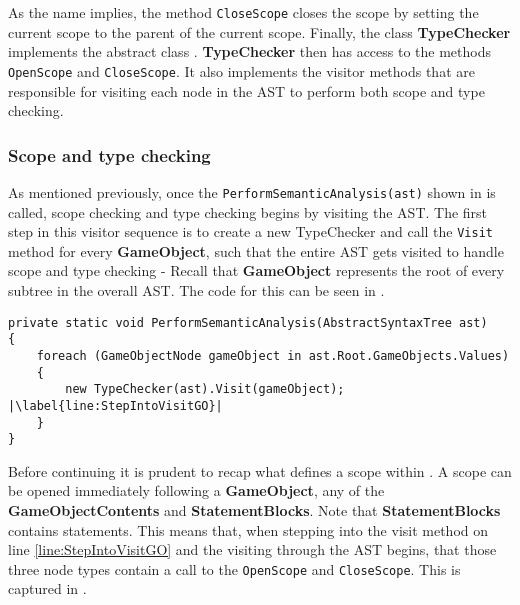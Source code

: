 As the name implies, the method \texttt{CloseScope} closes the scope by setting the current scope to the parent of the current scope. 
Finally, the class \textbf{TypeChecker} implements the abstract class \abstractsemanticclass{}. \textbf{TypeChecker} then has access to the methods \texttt{OpenScope} and \texttt{CloseScope}. It also implements the visitor methods that are responsible for visiting each node in the AST to perform both scope and type checking.

\subsubsection*{Scope and type checking} \label{sec:TypeChecker}
As mentioned previously, once the \texttt{PerformSemanticAnalysis(ast)} shown in  is called, scope checking and type checking begins by visiting the AST. The first step in this visitor sequence is to create a new TypeChecker and call the \texttt{Visit} method for every \textbf{GameObject}, such that the entire AST gets visited to handle scope and type checking - Recall that \textbf{GameObject} represents the root of every subtree in the overall AST. The code for this can be seen in .

\begin{lstlisting}[language=CSharp, caption={Typechecker object for every GameObject}, label={lst:TypeCheckEachGO},escapechar=|]
private static void PerformSemanticAnalysis(AbstractSyntaxTree ast)
{
    foreach (GameObjectNode gameObject in ast.Root.GameObjects.Values)
    {
        new TypeChecker(ast).Visit(gameObject); |\label{line:StepIntoVisitGO}|
    }
}
\end{lstlisting}

Before continuing it is prudent to recap what defines a scope within \dazel{}. A scope can be opened immediately following a \textbf{GameObject}, any of the \textbf{GameObjectContents} and \textbf{StatementBlocks}. Note that \textbf{StatementBlocks} contains statements. 
This means that, when stepping into the visit method on line \ref{line:StepIntoVisitGO} and the visiting through the AST begins, that those three node types contain a call to the \texttt{OpenScope} and \texttt{CloseScope}. This is captured in .

